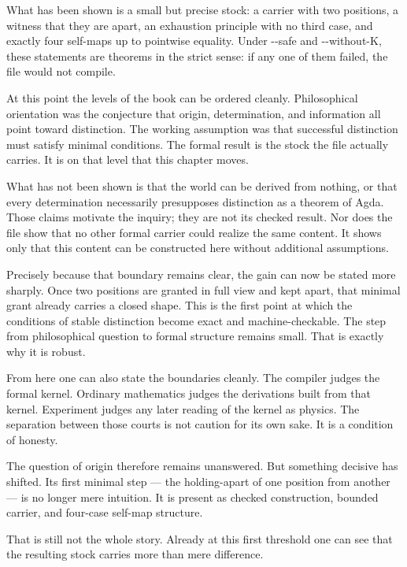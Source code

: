 \documentclass[11pt,a4paper]{book}
\newcommand{\AgdaFlag}[1]{\texttt{-{}-#1}}
\def\texttt#1{#1}%
\begin{document}
What has been shown is a small but precise stock: a carrier with two
positions, a witness that they are apart, an exhaustion principle with no
third case, and exactly four self-maps up to pointwise equality. Under
\AgdaFlag{safe} and \AgdaFlag{without-K}, these statements are theorems in
the strict sense: if any one of them failed, the file would not compile.

At this point the levels of the book can be ordered cleanly. Philosophical
orientation was the conjecture that origin, determination, and information
all point toward distinction. The working assumption was that successful
distinction must satisfy minimal conditions. The formal result is the stock
the file actually carries. It is on that level that this chapter moves.

What has not been shown is that the world can be derived from nothing, or
that every determination necessarily presupposes distinction as a theorem
of Agda. Those claims motivate the inquiry; they are not its checked
result. Nor does the file show that no other formal carrier could realize
the same content. It shows only that this content can be constructed here
without additional assumptions.

Precisely because that boundary remains clear, the gain can now be stated
more sharply. Once two positions are granted in full view and kept apart,
that minimal grant already carries a closed shape. This is the first point
at which the conditions of stable distinction become exact and
machine-checkable. The step from philosophical question to formal structure
remains small. That is exactly why it is robust.

From here one can also state the boundaries cleanly. The compiler judges
the formal kernel. Ordinary mathematics judges the derivations built from
that kernel. Experiment judges any later reading of the kernel as physics.
The separation between those courts is not caution for its own sake. It is
a condition of honesty.

The question of origin therefore remains unanswered. But something decisive
has shifted. Its first minimal step --- the holding-apart of one position
from another --- is no longer mere intuition. It is present as checked
construction, bounded carrier, and four-case self-map structure.

That is still not the whole story. Already at this first threshold one can
see that the resulting stock carries more than mere difference.

\end{document}
